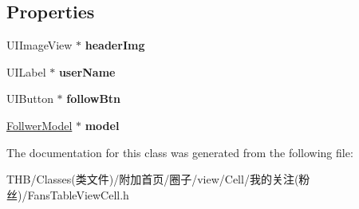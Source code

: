 \subsection*{Properties}
\begin{DoxyCompactItemize}
\item 
\mbox{\label{interface_fans_table_view_cell_aab34dd0cb529bfec0a7ebead581c8255}} 
U\+I\+Image\+View $\ast$ {\bfseries header\+Img}
\item 
\mbox{\label{interface_fans_table_view_cell_ab985f58d20f4ae404df0868edad19d95}} 
U\+I\+Label $\ast$ {\bfseries user\+Name}
\item 
\mbox{\label{interface_fans_table_view_cell_afa6db2cf22123b288f2c641005765c91}} 
U\+I\+Button $\ast$ {\bfseries follow\+Btn}
\item 
\mbox{\label{interface_fans_table_view_cell_a3192eecbb8bedb01170609e1fe34fa2f}} 
\mbox{\hyperlink{interface_follwer_model}{Follwer\+Model}} $\ast$ {\bfseries model}
\end{DoxyCompactItemize}


The documentation for this class was generated from the following file\+:\begin{DoxyCompactItemize}
\item 
T\+H\+B/\+Classes(类文件)/附加首页/圈子/view/\+Cell/我的关注(粉丝)/Fans\+Table\+View\+Cell.\+h\end{DoxyCompactItemize}
